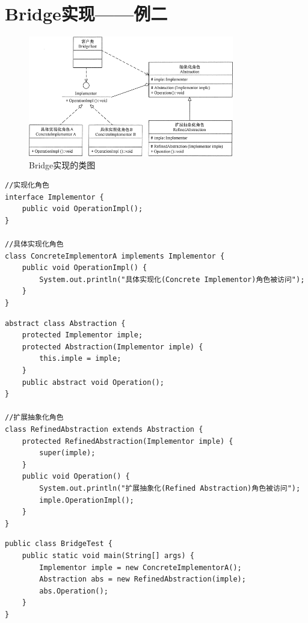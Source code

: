 \section{Bridge实现——例二}
\begin{figure}[!h]
	\centering
	\includegraphics[width=0.8\textwidth]{image/9-1}
	\caption{Bridge实现的类图}
\end{figure}
\begin{lstlisting}
//实现化角色
interface Implementor {
	public void OperationImpl();
}

//具体实现化角色
class ConcreteImplementorA implements Implementor {
	public void OperationImpl() {
		System.out.println("具体实现化(Concrete Implementor)角色被访问");
	}
}
\end{lstlisting}
\begin{lstlisting}
abstract class Abstraction {
	protected Implementor imple;
	protected Abstraction(Implementor imple) {
		this.imple = imple;
	}
	public abstract void Operation();
}

//扩展抽象化角色
class RefinedAbstraction extends Abstraction {
	protected RefinedAbstraction(Implementor imple) {
		super(imple);
	}
	public void Operation() {
		System.out.println("扩展抽象化(Refined Abstraction)角色被访问");
		imple.OperationImpl();
	}
}
\end{lstlisting}
\begin{lstlisting}
public class BridgeTest {
	public static void main(String[] args) {
		Implementor imple = new ConcreteImplementorA();
		Abstraction abs = new RefinedAbstraction(imple);
		abs.Operation();
	}
}
\end{lstlisting}
